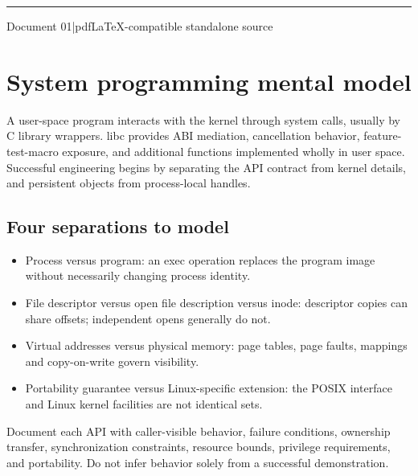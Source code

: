 \documentclass[11pt,letterpaper,oneside]{report}
\begin{document}
\hypersetup{pageanchor=false}%
\begin{titlepage}\centering{}\vspace{0.6cm}{\Large Linux and UNIX system programming architecture\par}\vspace{2cm}\rule{0.75\textwidth}{1.2pt}\par\vspace{0.55cm}{\large An original companion to Michael Kerrisk\textquotesingle s 2010 text}\par\vspace{0.3cm}{\large Edition 1.0\quad |\quad October 2026}\par\vfill{\small Document 01\quad |\quad pdfLaTeX-compatible standalone source}\par\end{titlepage}\hypersetup{pageanchor=true}
\tableofcontents\clearpage
\chapter{System programming mental model}
A user-space program interacts with the kernel through system calls, usually by C library wrappers. libc provides ABI mediation, cancellation behavior, feature-test-macro exposure, and additional functions implemented wholly in user space. Successful engineering begins by separating the API contract from kernel details, and persistent objects from process-local handles.

\section{Four separations to model}
\begin{itemize}
\item Process versus program: an exec operation replaces the program image without necessarily changing process identity.
\item File descriptor versus open file description versus inode: descriptor copies can share offsets; independent opens generally do not.
\item Virtual addresses versus physical memory: page tables, page faults, mappings and copy-on-write govern visibility.
\item Portability guarantee versus Linux-specific extension: the POSIX interface and Linux kernel facilities are not identical sets.
\end{itemize}
\begin{engineeringnote}
Document each API with caller-visible behavior, failure conditions, ownership transfer, synchronization constraints, resource bounds, privilege requirements, and portability. Do not infer behavior solely from a successful demonstration.
\end{engineeringnote}
\end{document}
